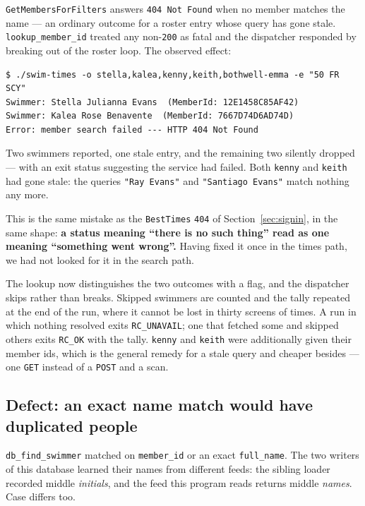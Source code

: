 \documentclass[11pt]{article}
\newcommand{\code}[1]{\texttt{#1}}
\begin{document}
\code{GetMembersForFilters} answers \code{404 Not Found} when no member
matches the name --- an ordinary outcome for a roster entry whose query
has gone stale.  \code{lookup\_member\_id} treated any non-\code{200} as
fatal and the dispatcher responded by breaking out of the roster loop.
The observed effect:

\begin{lstlisting}
$ ./swim-times -o stella,kalea,kenny,keith,bothwell-emma -e "50 FR SCY"
Swimmer: Stella Julianna Evans  (MemberId: 12E1458C85AF42)
Swimmer: Kalea Rose Benavente  (MemberId: 7667D74D6AD74D)
Error: member search failed --- HTTP 404 Not Found
\end{lstlisting}

\noindent Two swimmers reported, one stale entry, and the remaining two
silently dropped --- with an exit status suggesting the service had
failed.  Both \code{kenny} and \code{keith} had gone stale: the queries
\code{"Ray Evans"} and \code{"Santiago Evans"} match nothing any more.

This is the same mistake as the \code{BestTimes} \code{404} of
Section~\ref{sec:signin}, in the same shape: \textbf{a status meaning
``there is no such thing'' read as one meaning ``something went
wrong''.} Having fixed it once in the times path, we had not looked for
it in the search path.

The lookup now distinguishes the two outcomes with a flag, and the
dispatcher skips rather than breaks.  Skipped swimmers are counted and
the tally repeated at the end of the run, where it cannot be lost in
thirty screens of times.  A run in which nothing resolved exits
\code{RC\_UNAVAIL}; one that fetched some and skipped others exits
\code{RC\_OK} with the tally.  \code{kenny} and \code{keith} were
additionally given their member ids, which is the general remedy for a
stale query and cheaper besides --- one \code{GET} instead of a
\code{POST} and a scan.

\subsection{Defect: an exact name match would have duplicated people}

\code{db\_find\_swimmer} matched on \code{member\_id} or an exact
\code{full\_name}.  The two writers of this database learned their names
from different feeds: the sibling loader recorded middle
\emph{initials}, and the feed this program reads returns middle
\emph{names}.  Case differs too.
\end{document}
